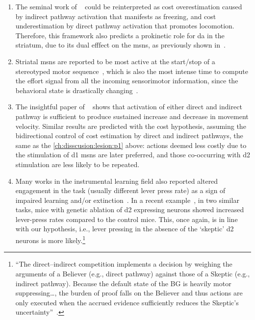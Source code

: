 \begin{enumerate}[noitemsep, label=\Roman*.]
    \item \label{ch:disscusion:lesion:p1} The seminal work of \citeauthor{Kravitz2010Nature}~\cite{Kravitz2010Nature} could be reinterpreted as cost overestimation caused by indirect pathway activation that manifests as freezing, and cost underestimation by direct pathway activation that promotes locomotion.
    Therefore, this framework also predicts a prokinetic role for \gls{da} in the striatum, due to its dual efffect on the \glspl{msn}, as previously shown in~\cite{Howe2016N}.
    \item Striatal \glspl{msn} are reported to be most active at the start/stop of a stereotyped motor sequence~\cite{Barnes2005Nature, Jin2014NN}, which is also the most intense time to compute the effort signal from all the incoming sensorimotor information, since the behavioral state is drastically changing~\cite{Sales-Carbonell2018, Robbe2018}.
    \item The insightful paper of ~\cite{Yttri2016Nature} shows that activation of either direct and indirect pathway is sufficient to produce sustained increase and decrease in movement velocity.
    Similar results are predicted with the cost hypothesis, assuming the bidirectional control of cost estimation by direct and indirect pathways, the same as the \autoref{ch:disscusion:lesion:p1} above:
    actions deemed less costly due to the stimulation of \gls{d1} \glspl{msn} are later preferred, and those co-occurring with \gls{d2} stimulation are less likely to be repeated.
    \item Many works in the instrumental learning field also reported altered engagement in the task (usually different lever press rate) as a sign of impaired learning and/or extinction~\cite[see][as an example]{Hart2018CurrBiol}.
    In a recent example~\cite{Matamales2020Sci}, in two similar tasks, mice with genetic ablation of \gls{d2} expressing neurons showed increased lever-press rates compared to the control mice.
    This, once again, is in line with our hypothesis, i.e., lever pressing in the absence of the `skeptic' \gls{d2} neurons is more likely.\footnote{
        ``The direct–indirect competition implements a decision by weighing the arguments of a Believer (e.g., direct pathway) against those of a Skeptic (e.g., indirect pathway).
        Because the default state of the BG is heavily motor suppressing\ldots, the burden of proof falls on the Believer and thus actions are only executed when the accrued evidence sufficiently reduces the Skeptic’s uncertainty''~\cite{Dunovan2016FrontNeurosci}.
    }
\end{enumerate}
